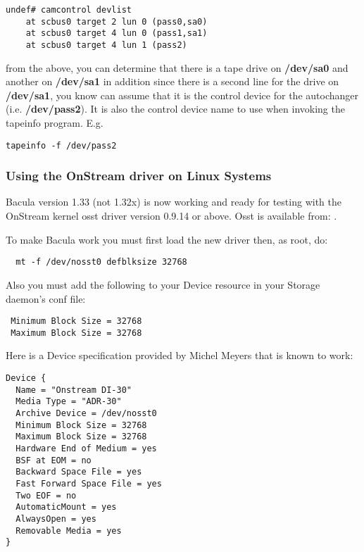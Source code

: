 \footnotesize
\begin{verbatim}
undef# camcontrol devlist
    at scbus0 target 2 lun 0 (pass0,sa0)
    at scbus0 target 4 lun 0 (pass1,sa1)
    at scbus0 target 4 lun 1 (pass2)
\end{verbatim}
\normalsize

from the above, you can determine that there is a tape drive on {\bf /dev/sa0}
and another on {\bf /dev/sa1} in addition since there is a second line for the
drive on {\bf /dev/sa1}, you know can assume that it is the control device for
the autochanger (i.e. {\bf /dev/pass2}). It is also the control device name to
use when invoking the tapeinfo program. E.g. 

\footnotesize
\begin{verbatim}
tapeinfo -f /dev/pass2
\end{verbatim}
\normalsize

\label{onstream}

\subsubsection*{Using the OnStream driver on Linux Systems}

Bacula version 1.33 (not 1.32x) is now working and ready for testing with the
OnStream kernel osst driver version 0.9.14 or above. Osst is available from: 
. 

To make Bacula work you must first load the new driver then, as root, do: 

\footnotesize
\begin{verbatim}
  mt -f /dev/nosst0 defblksize 32768
\end{verbatim}
\normalsize

Also you must add the following to your Device resource in your Storage
daemon's conf file: 

\footnotesize
\begin{verbatim}
 Minimum Block Size = 32768
 Maximum Block Size = 32768
\end{verbatim}
\normalsize

Here is a Device specification provided by Michel Meyers that is known to
work: 

\footnotesize
\begin{verbatim}
Device {
  Name = "Onstream DI-30"
  Media Type = "ADR-30"
  Archive Device = /dev/nosst0
  Minimum Block Size = 32768
  Maximum Block Size = 32768
  Hardware End of Medium = yes
  BSF at EOM = no
  Backward Space File = yes
  Fast Forward Space File = yes
  Two EOF = no
  AutomaticMount = yes
  AlwaysOpen = yes
  Removable Media = yes
}
\end{verbatim}
\normalsize

